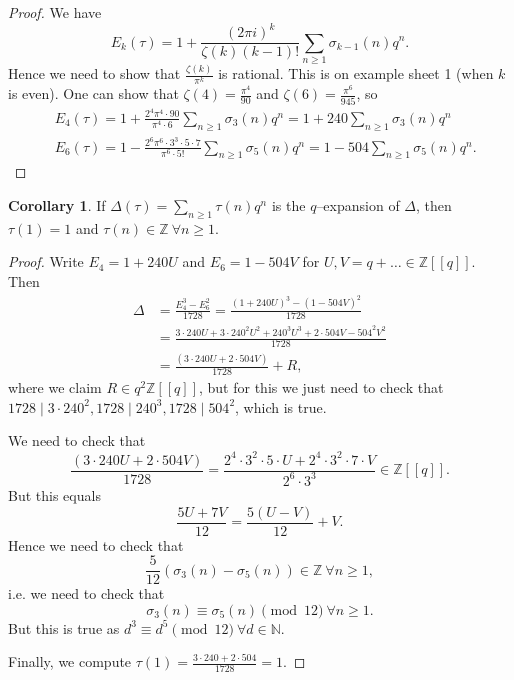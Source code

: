 \documentclass{article}
\theoremstyle{definition}
\newtheorem{cor}[theorem]{Corollary}
\begin{document}
\begin{proof}
    We have $$E_k(\tau) = 1 + \frac{(2\pi i)^k}{\zeta(k)(k-1)!}\sum_{n\ge 1}^{} \sigma_{k-1}(n)q^n.$$
    Hence we need to show that $\frac{\zeta(k)}{\pi^k}$ is rational. This is on example sheet 1 (when $k$ is even). One can show that $\zeta(4) = \frac{\pi^4}{90}$ and $\zeta(6) = \frac{\pi^6}{945}$, so 
    \begin{align*}
        &E_4(\tau) = 1 + \frac{2^4 \pi^4 \cdot 90}{\pi^4 \cdot 6}\sum_{n\ge 1}^{} \sigma_3(n)q^n = 1 + 240\sum_{n\ge 1}^{} \sigma_3(n)q^n\\
        &E_6(\tau) = 1 -\frac{2^6 \pi^6 \cdot 3^3 \cdot 5 \cdot 7}{\pi^6 \cdot 5!}\sum_{n\ge 1}^{} \sigma_5(n)q^n = 1 - 504 \sum_{n\ge 1}^{} \sigma_5(n)q^n.
    \end{align*}
\end{proof}
\begin{cor}
    If $\Delta(\tau) = \sum_{n\ge 1}^{} \tau(n)q^n$ is the $q$--expansion of $\Delta$, then $\tau(1)=1$ and $\tau(n) \in \mathbb{Z} ~\forall n\ge 1$.
\end{cor}
\begin{proof}
    Write $E_4 = 1 + 240U$ and $E_6 = 1 -504V$ for $U,V = q + \ldots \in \mathbb{Z}[[q]]$. Then 
    \begin{align*}
        \Delta &= \frac{E_4^3-E_6^2}{1728} = \frac{(1+240U)^3-(1-504V)^2}{1728} \\
        &= \frac{3\cdot 240U + 3\cdot 240^2 U^2 + 240^3 U^3 + 2\cdot 504V - 504^2V^2}{1728}\\
        &= \frac{(3\cdot 240 U + 2\cdot 504 V)}{1728} + R,
    \end{align*}
    where we claim $R \in q^2\mathbb{Z}[[q]]$, but for this we just need to check that $1728 \mid 3\cdot 240^2, 1728 \mid240^3, 1728 \mid504^2$, which is true.
    \vspace{1mm}
     
    We need to check that $$\frac{(3\cdot 240 U + 2\cdot 504 V)}{1728} = \frac{2^4 \cdot 3^2\cdot 5\cdot U + 2^4 \cdot 3^2\cdot 7\cdot V}{2^6\cdot 3^3} \in \mathbb{Z}[[q]].$$ But this equals \[
    \frac{5U+7V}{12} = \frac{5(U-V)}{12} + V.
    \]
    Hence we need to check that \[
    \frac{5}{12}(\sigma_3(n)-\sigma_5(n)) \in \mathbb{Z} ~\forall n\ge 1,
    \]
    i.e. we need to check that \[
    \sigma_3(n) \equiv \sigma_5(n) \pmod{12} ~\forall n\ge 1.
    \]
    But this is true as $d^3 \equiv d^5 \pmod{12} ~\forall d \in \mathbb{N}$.
    \vspace{1mm}
     
    Finally, we compute $\tau(1) =\frac{3\cdot 240 + 2\cdot 504}{1728} = 1$. 
\end{proof}
\end{document}
